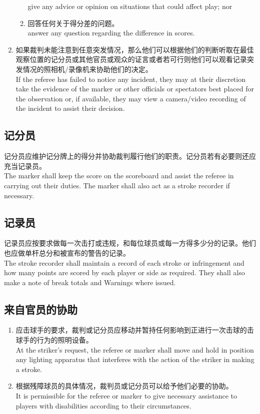 \begin{enumerate}[label=(\alph*)]
\begin{enumerate}[label=(\roman*)]
        give any advice or opinion on situations that could affect play; nor
        \item 回答任何关于得分差的问题。\\
        answer any question regarding the difference in scores.
    \end{enumerate}
    \item 如果裁判未能注意到任意突发情况，那么他们可以根据他们的判断听取在最佳观察位置的记分员或其他官员或观众的证言或者若可行则他们可以观看记录突发情况的照相机/录像机来协助他们的决定。\\
    If the referee has failed to notice any incident, they may at their discretion take the evidence of the marker or other officials or spectators best placed for the observation or, if available, they may view a camera/video recording of the incident to assist their decision.
\end{enumerate}

\subsection{记分员}

\noindent 记分员应维护记分牌上的得分并协助裁判履行他们的职责。记分员若有必要则还应充当记录员。\\
The marker shall keep the score on the scoreboard and assist the referee in carrying out their duties. The marker shall also act as a stroke recorder if necessary.

\subsection{记录员}

\noindent 记录员应按要求做每一次击打或违规，和每位球员或每一方得多少分的记录。他们也应做单杆总分和被宣布的警告的记录。\\
The stroke recorder shall maintain a record of each stroke or infringement and how many points are scored by each player or side as required. They shall also make a note of break totals and Warnings where issued.

\subsection{来自官员的协助}

\begin{enumerate}[label=(\alph*)]
    \item 应击球手的要求，裁判或记分员应移动并暂持任何影响到正进行一次击球的击球手的行为的照明设备。\\
    At the striker's request, the referee or marker shall move and hold in position any lighting apparatus that interferes with the action of the striker in making a stroke.
    \item 根据残障球员的具体情况，裁判员或记分员可以给予他们必要的协助。\\
    It is permissible for the referee or marker to give necessary assistance to players with disabilities according to their circumstances.
\end{enumerate}
